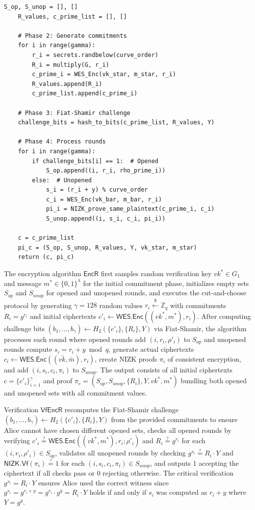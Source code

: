 \documentclass[11pt,a4paper]{article}
\newcommand{\ZZ}{\mathbb{Z}}
\begin{document}
{\begin{lstlisting}[caption={VWER Encryption Implementation}]
    S_op, S_unop = [], []
    R_values, c_prime_list = [], []
    
    # Phase 2: Generate commitments
    for i in range(gamma):
        r_i = secrets.randbelow(curve_order)
        R_i = multiply(G, r_i)
        c_prime_i = WES_Enc(vk_star, m_star, r_i)
        R_values.append(R_i)
        c_prime_list.append(c_prime_i)
    
    # Phase 3: Fiat-Shamir challenge
    challenge_bits = hash_to_bits(c_prime_list, R_values, Y)
    
    # Phase 4: Process rounds
    for i in range(gamma):
        if challenge_bits[i] == 1:  # Opened
            S_op.append((i, r_i, rho_prime_i))
        else:  # Unopened
            s_i = (r_i + y) % curve_order
            c_i = WES_Enc(vk_bar, m_bar, r_i)
            pi_i = NIZK_prove_same_plaintext(c_prime_i, c_i)
            S_unop.append((i, s_i, c_i, pi_i))
    
    c = c_prime_list
    pi_c = (S_op, S_unop, R_values, Y, vk_star, m_star)
    return (c, pi_c)
\end{lstlisting}

The encryption algorithm $\textsf{EncR}$ first samples random verification key $vk^* \in G_1$ and message $m^* \in \{0,1\}^\lambda$ for the initial commitment phase, initializes empty sets $S_{op}$ and $S_{unop}$ for opened and unopened rounds, and executes the cut-and-choose protocol by generating $\gamma = 128$ random values $r_i \xleftarrow{\$} \ZZ_q$ with commitments $R_i = g^{r_i}$ and initial ciphertexts $c'_i \leftarrow \textsf{WES.Enc}((vk^*, m^*), r_i)$. After computing challenge bits $(b_1, \ldots, b_\gamma) \leftarrow H_2(\{c'_i\}, \{R_i\}, Y)$ via Fiat-Shamir, the algorithm processes each round where opened rounds add $(i, r_i, \rho'_i)$ to $S_{op}$ and unopened rounds compute $s_i = r_i + y \bmod q$, generate actual ciphertexts $c_i \leftarrow \textsf{WES.Enc}((\bar{vk}, \bar{m}), r_i)$, create NIZK proofs $\pi_i$ of consistent encryption, and add $(i, s_i, c_i, \pi_i)$ to $S_{unop}$. The output consists of all initial ciphertexts $c = \{c'_i\}_{i=1}^\gamma$ and proof $\pi_c = (S_{op}, S_{unop}, \{R_i\}, Y, vk^*, m^*)$ bundling both opened and unopened sets with all commitment values.

Verification $\textsf{VfEncR}$ recomputes the Fiat-Shamir challenge $(b_1, \ldots, b_\gamma) \leftarrow H_2(\{c'_i\}, \{R_i\}, Y)$ from the provided commitments to ensure Alice cannot have chosen different opened sets, checks all opened rounds by verifying $c'_i \stackrel{?}{=} \textsf{WES.Enc}((vk^*, m^*), r_i; \rho'_i)$ and $R_i \stackrel{?}{=} g^{r_i}$ for each $(i, r_i, \rho'_i) \in S_{op}$, validates all unopened rounds by checking $g^{s_i} \stackrel{?}{=} R_i \cdot Y$ and $\textsf{NIZK.Vf}(\pi_i) \stackrel{?}{=} 1$ for each $(i, s_i, c_i, \pi_i) \in S_{unop}$, and outputs 1 accepting the ciphertext if all checks pass or 0 rejecting otherwise. The critical verification $g^{s_i} = R_i \cdot Y$ ensures Alice used the correct witness since $g^{s_i} = g^{r_i + y} = g^{r_i} \cdot g^y = R_i \cdot Y$ holds if and only if $s_i$ was computed as $r_i + y$ where $Y = g^y$.

}
\end{document}
